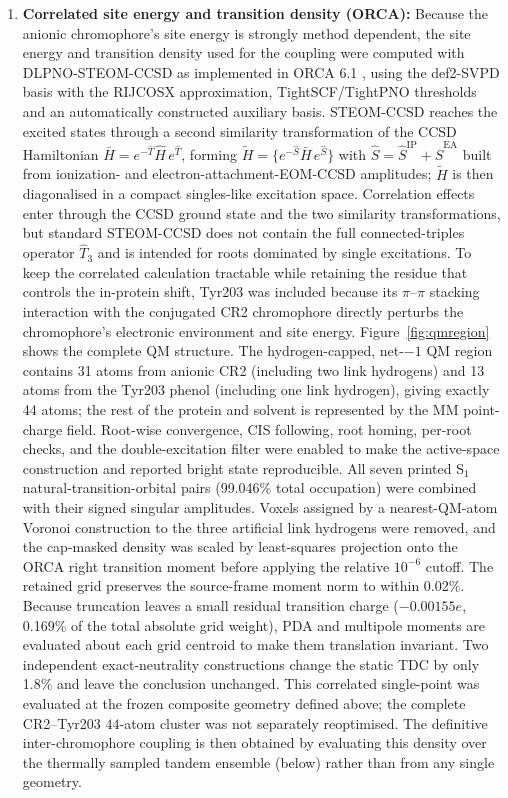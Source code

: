 \documentclass[journal=jpcbfk, manuscript=article, layout=twocolumn, doi=true]{achemso}
\begin{document}
\begin{enumerate}
    \item \textbf{Correlated site energy and transition density (ORCA):} Because the anionic chromophore's site energy is strongly method dependent, the site energy and transition density used for the coupling were computed with DLPNO-STEOM-CCSD \cite{nooijen1997steom,dutta2016dlpno,dutta2018ipeom,dutta2019eaeom,riplinger2013dlpno} as implemented in ORCA 6.1 \cite{neese2020orca,neese2022orca}, using the def2-SVPD basis \cite{weigend2005def2,rappoport2010svpd} with the RIJCOSX approximation, TightSCF/TightPNO thresholds and an automatically constructed auxiliary basis. STEOM-CCSD reaches the excited states through a second similarity transformation of the CCSD Hamiltonian $\bar H = e^{-\hat T}\hat H\,e^{\hat T}$, forming $\tilde H = \{e^{-\hat S}\bar H\,e^{\hat S}\}$ with $\hat S = \hat S^{\mathrm{IP}} + \hat S^{\mathrm{EA}}$ built from ionization- and electron-attachment-EOM-CCSD amplitudes; $\tilde H$ is then diagonalised in a compact singles-like excitation space. Correlation effects enter through the CCSD ground state and the two similarity transformations, but standard STEOM-CCSD does not contain the full connected-triples operator $\hat T_3$ and is intended for roots dominated by single excitations. To keep the correlated calculation tractable while retaining the residue that controls the in-protein shift, Tyr203 was included because its $\pi$--$\pi$ stacking interaction with the conjugated CR2 chromophore directly perturbs the chromophore's electronic environment and site energy. Figure~\ref{fig:qmregion} shows the complete QM structure. The hydrogen-capped, net-$-1$ QM region contains 31 atoms from anionic CR2 (including two link hydrogens) and 13 atoms from the Tyr203 phenol (including one link hydrogen), giving exactly 44 atoms; the rest of the protein and solvent is represented by the MM point-charge field. Root-wise convergence, CIS following, root homing, per-root checks, and the double-excitation filter were enabled to make the active-space construction and reported bright state reproducible. All seven printed S$_1$ natural-transition-orbital pairs (99.046\% total occupation) were combined with their signed singular amplitudes. Voxels assigned by a nearest-QM-atom Voronoi construction to the three artificial link hydrogens were removed, and the cap-masked density was scaled by least-squares projection onto the ORCA right transition moment before applying the relative $10^{-6}$ cutoff. The retained grid preserves the source-frame moment norm to within 0.02\%. Because truncation leaves a small residual transition charge ($-0.00155e$, 0.169\% of the total absolute grid weight), PDA and multipole moments are evaluated about each grid centroid to make them translation invariant. Two independent exact-neutrality constructions change the static TDC by only 1.8\% and leave the conclusion unchanged. This correlated single-point was evaluated at the frozen composite geometry defined above; the complete CR2--Tyr203 $44$-atom cluster was not separately reoptimised. The definitive inter-chromophore coupling is then obtained by evaluating this density over the thermally sampled tandem ensemble (below) rather than from any single geometry.


\end{enumerate}
\end{document}
